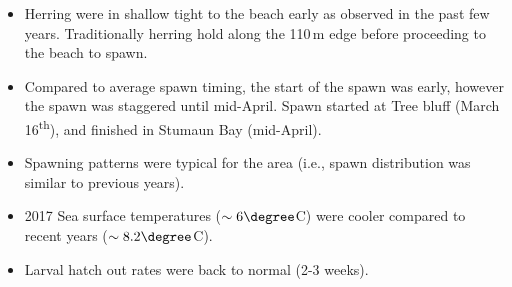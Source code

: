 \begin{itemize}
\item Herring were in shallow tight to the beach early as observed in the past few years.
Traditionally herring hold along the 110\,m edge before proceeding to the beach to spawn.
\item Compared to average spawn timing, the start of the spawn was early, however the spawn was staggered until mid-April.
Spawn started at Tree bluff (March 16\textsuperscript{th}), and finished in Stumaun Bay (mid-April).
\item Spawning patterns were typical for the area (i.e., spawn distribution was similar to previous years).
\item 2017 Sea surface temperatures ($\sim6\degree$C) were cooler compared to recent years ($\sim8.2\degree$C).
\item Larval hatch out rates were back to normal (2-3 weeks).
\end{itemize}
